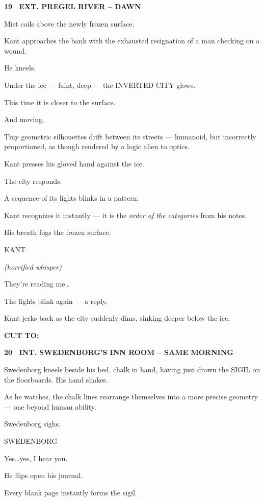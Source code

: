 \documentclass[12pt]{article}
\newcommand{\scene}[2]{%
  \vspace{1.8\baselineskip}%
  \noindent\textbf{#1 \ #2}\par\vspace{0.4\baselineskip}%
}
\newenvironment{dialogue}[1]{%
  \vspace{0.8\baselineskip}%
  \noindent\hspace*{2.3in}\textsc{#1}\par%
  \noindent\hspace*{1.5in}\begin{minipage}[t]{4.5in}%
}{%
  \end{minipage}\par%
}
\newcommand{\paren}[1]{%
  \noindent\hspace*{1.8in}\textit{(#1)}\par%
}
\newcommand{\transition}[1]{%
  \vspace{0.6\baselineskip}%
  \begin{flushright}\textbf{#1}\end{flushright}%
}
\begin{document}
\scene{19}{EXT. PREGEL RIVER -- DAWN}

Mist coils above the newly frozen surface.

Kant approaches the bank with the exhausted resignation of a man
checking on a wound.

He kneels.

Under the ice — faint, deep — the INVERTED CITY glows.

This time it is closer to the surface.

And moving.

Tiny geometric silhouettes drift between its streets — humanoid, but
incorrectly proportioned, as though rendered by a logic alien to optics.

Kant presses his gloved hand against the ice.

The city responds.

A sequence of its lights blinks in a pattern.

Kant recognizes it instantly — it is the \emph{order of the categories}
from his notes.

His breath fogs the frozen surface.

\begin{dialogue}{KANT}
\paren{horrified whisper}
They're reading me\ldots
\end{dialogue}

The lights blink again — a reply.

Kant jerks back as the city suddenly dims, sinking deeper below the ice.

\transition{CUT TO:}


\scene{20}{INT. SWEDENBORG'S INN ROOM -- SAME MORNING}

Swedenborg kneels beside his bed, chalk in hand, having just drawn the
SIGIL on the floorboards. His hand shakes.

As he watches, the chalk lines rearrange themselves into a more precise
geometry — one beyond human ability.

Swedenborg sighs.

\begin{dialogue}{SWEDENBORG}
Yes\ldots yes, I hear you.
\end{dialogue}

He flips open his journal.

Every blank page instantly forms the sigil.
\end{document}
